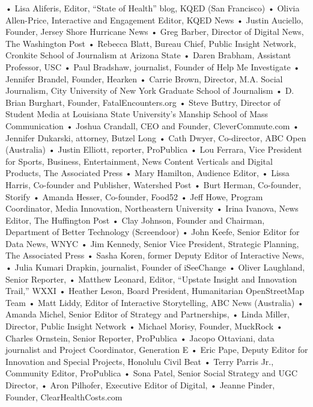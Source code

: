 \begin{itemize}
\begin{itemize}
\begin{enumerate}
{• Lisa Aliferis, Editor, “State of Health” blog, KQED (San Francisco)
• Olivia Allen-Price, Interactive and Engagement Editor, KQED News
• Justin Auciello, Founder, Jersey Shore Hurricane News
• Greg Barber, Director of Digital News, The Washington Post
• Rebecca Blatt, Bureau Chief, Public Insight Network, Cronkite School of Journalism at Arizona State
• Daren Brabham, Assistant Professor, USC
• Paul Bradshaw, journalist, Founder of Help Me Investigate
• Jennifer Brandel, Founder, Hearken
• Carrie Brown, Director, M.A. Social Journalism, City University of New York Graduate School of Journalism
• D. Brian Burghart, Founder, FatalEncounters.org
• Steve Buttry, Director of Student Media at Louisiana State University’s Manship School of Mass Communication
• Joshua Crandall, CEO and Founder, CleverCommute.com
• Jennifer Dukarski, attorney, Butzel Long
• Cath Dwyer, Co-director, ABC Open (Australia)
• Justin Elliott, reporter, ProPublica
• Lou Ferrara, Vice President for Sports, Business, Entertainment, News Content Verticals and Digital Products, The Associated Press
• Mary Hamilton, Audience Editor, 
• Lissa Harris, Co-founder and Publisher, Watershed Post 
• Burt Herman, Co-founder, Storify
• Amanda Hesser, Co-founder, Food52
• Jeff Howe, Program Coordinator, Media Innovation, Northeastern University
• Irina Ivanova, News Editor, The Huffington Post
• Clay Johnson, Founder and Chairman, Department of Better Technology (Screendoor)
• John Keefe, Senior Editor for Data News, WNYC
• Jim Kennedy, Senior Vice President, Strategic Planning, The Associated Press
• Sasha Koren, former Deputy Editor of Interactive News, 
• Julia Kumari Drapkin, journalist, Founder of iSeeChange
• Oliver Laughland, Senior Reporter, 
• Matthew Leonard, Editor, “Upstate Insight and Innovation Trail,” WXXI
• Heather Leson, Board President, Humanitarian OpenStreetMap Team
• Matt Liddy, Editor of Interactive Storytelling, ABC News (Australia)
• Amanda Michel, Senior Editor of Strategy and Partnerships, 
• Linda Miller, Director, Public Insight Network
• Michael Morisy, Founder, MuckRock
• Charles Ornstein, Senior Reporter, ProPublica
• Jacopo Ottaviani, data journalist and Project Coordinator, Generation E
• Eric Pape, Deputy Editor for Innovation and Special Projects, Honolulu Civil Beat
• Terry Parris Jr., Community Editor, ProPublica
• Sona Patel, Senior Social Strategy and UGC Director, 
• Aron Pilhofer, Executive Editor of Digital, 
• Jeanne Pinder, Founder, ClearHealthCosts.com
}
\end{enumerate}
\end{itemize}
\end{itemize}
